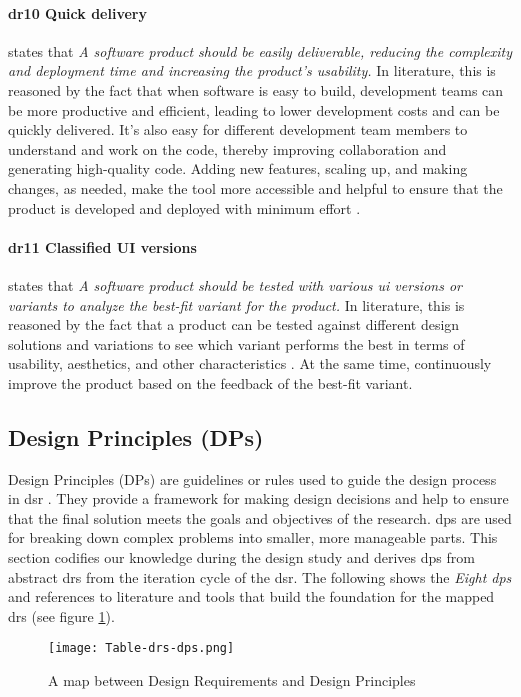 \paragraph{\ac{dr}10 Quick delivery} states that \textit{A software product should be easily deliverable, reducing the complexity and deployment time and increasing the product's usability.} 
In literature, this is reasoned by the fact that when software is easy to build, development teams can be more productive and efficient, leading to lower development costs \cite{misc:lowcode:platforms} and can be quickly delivered. 
It's also easy for different development team members to understand and work on the code, thereby improving collaboration \cite{misc:prorotypes:lauff} and generating high-quality code.
Adding new features, scaling up, and making changes, as needed, make the tool more accessible and helpful \cite{article:prototyping:lowcode} to ensure that the product is developed and deployed with minimum effort \cite{article:prototyping:lowcode}.

\paragraph*{\ac{dr}11 Classified UI versions} states that \textit{A software product should be tested with various \ac{ui} versions or variants to analyze the best-fit variant for the product.}
In literature, this is reasoned by the fact that a product can be tested against different design solutions and variations \cite{article:CE:fitzgerald} to see which variant performs the best in terms of usability, aesthetics, and other characteristics \cite{article:controlled:experiements}. 
At the same time, continuously improve \cite{article:CE:ros} the product based on the feedback of the best-fit variant.

\subsection{Design Principles (DPs)}
\label{design:section:designprinciple}
Design Principles (DPs) are guidelines or rules used to guide the design process in \ac{dsr} \cite{misc:dsr:henver}. 
They provide a framework for making design decisions \cite{paper:designprinciple:gregor} and help to ensure that the final solution meets the goals and objectives of the research. 
\ac{dp}s are used for breaking down complex problems into smaller, more manageable parts.
This section codifies our knowledge during the design study and derives \ac{dp}s from abstract \ac{dr}s from the iteration cycle of the \ac{dsr}.
The following shows the \textit{Eight \ac{dp}s} and references to literature and tools that build the foundation for the mapped \ac{dr}s (see figure \ref{fig:design:table-drs-dps}). 
\begin{figure}[htbp!]
  \centering    
  \texttt{[image: Table-drs-dps.png]}
  \caption[A map between \ac{dr}s and \ac{dp}s]{A map between Design Requirements and Design Principles}
  \label{fig:design:table-drs-dps}
\end{figure}

